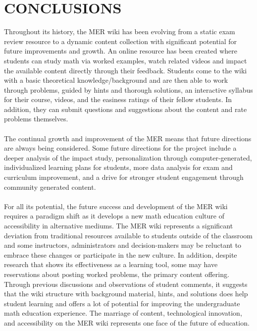 \documentclass{primus}
\begin{document}
\section{CONCLUSIONS}\label{sec:Conclusions}
Throughout its history, the MER wiki has been evolving from a static exam review resource to a dynamic content collection with significant potential for future improvements and growth. An online resource has been created where students can study math via worked examples, watch related videos and impact the available content directly through their feedback. Students come to the wiki with a basic theoretical knowledge/background and are then able to work through problems, guided by hints and thorough solutions, an interactive syllabus for their course, videos, and the easiness ratings of their fellow students. In addition, they can submit questions and suggestions about the content and rate problems themselves.
\\\\
\noindent{}The continual growth and improvement of the MER means that future directions are always being considered.  Some future directions for the project include a deeper analysis of the impact study, personalization through computer-generated, individualized learning plans for students,  more data analysis for exam and curriculum improvement, and a drive for stronger student engagement through community generated content.
\\\\
\noindent{}For all its potential, the future success and development of the MER wiki requires a paradigm shift as it develops a new math education culture of accessibility in alternative mediums. The MER wiki represents a significant deviation from traditional resources available to students outside of the classroom and some instructors, administrators and decision-makers may be reluctant to embrace these changes or participate in the new culture. In addition, despite research that shows its effectiveness as a learning tool, some may have reservations about posting worked problems, the primary content offering. Through previous discussions and observations of student comments, it suggests that the wiki structure with background material, hints, and solutions does help student learning and offers a lot of potential for improving the undergraduate math education experience. The marriage of content, technological innovation, and accessibility on the MER wiki represents one face of the future of education.
\\\\
\end{document}
